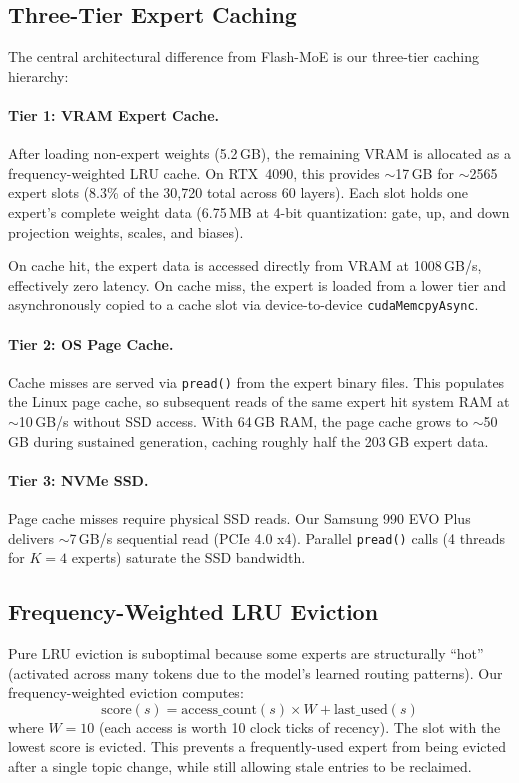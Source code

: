 \documentclass[11pt]{article}
\begin{document}
\subsection{Three-Tier Expert Caching}
\label{sec:cache}

The central architectural difference from Flash-MoE is our three-tier caching hierarchy:

\paragraph{Tier 1: VRAM Expert Cache.}
After loading non-expert weights (5.2\,GB), the remaining VRAM is allocated as a frequency-weighted LRU cache. On RTX~4090, this provides $\sim$17\,GB for $\sim$2565 expert slots (8.3\% of the 30,720 total across 60 layers). Each slot holds one expert's complete weight data (6.75\,MB at 4-bit quantization: gate, up, and down projection weights, scales, and biases).

On cache hit, the expert data is accessed directly from VRAM at 1008\,GB/s, effectively zero latency. On cache miss, the expert is loaded from a lower tier and asynchronously copied to a cache slot via device-to-device \texttt{cudaMemcpyAsync}.

\paragraph{Tier 2: OS Page Cache.}
Cache misses are served via \texttt{pread()} from the expert binary files. This populates the Linux page cache, so subsequent reads of the same expert hit system RAM at $\sim$10\,GB/s without SSD access. With 64\,GB RAM, the page cache grows to $\sim$50\,GB during sustained generation, caching roughly half the 203\,GB expert data.

\paragraph{Tier 3: NVMe SSD.}
Page cache misses require physical SSD reads. Our Samsung 990 EVO Plus delivers $\sim$7\,GB/s sequential read (PCIe 4.0 x4). Parallel \texttt{pread()} calls (4 threads for $K=4$ experts) saturate the SSD bandwidth.

\subsection{Frequency-Weighted LRU Eviction}

Pure LRU eviction is suboptimal because some experts are structurally ``hot'' (activated across many tokens due to the model's learned routing patterns). Our frequency-weighted eviction computes:
\[
\text{score}(s) = \text{access\_count}(s) \times W + \text{last\_used}(s)
\]
where $W=10$ (each access is worth 10 clock ticks of recency). The slot with the lowest score is evicted. This prevents a frequently-used expert from being evicted after a single topic change, while still allowing stale entries to be reclaimed.
\end{document}
